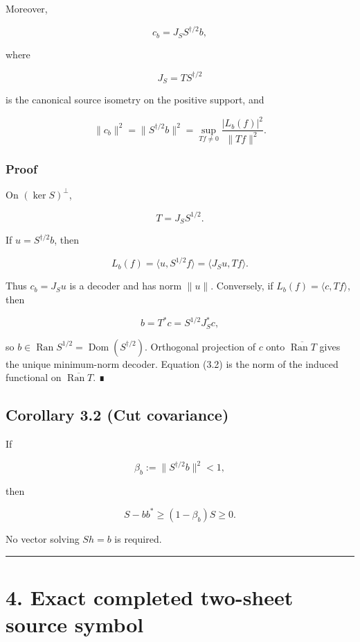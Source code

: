 Moreover,

\[
\boxed{
c_b=J_S S^{\dagger/2}b,
}
\tag{3.1}
\]

where

\[
J_S=T S^{\dagger/2}
\]

is the canonical source isometry on the positive support, and

\[
\boxed{
\|c_b\|^2
=
\|S^{\dagger/2}b\|^2
=
\sup_{Tf\ne0}
\frac{|L_b(f)|^2}{\|Tf\|^2}.
}
\tag{3.2}
\]

\hypertarget{proof}{%
\subsubsection{Proof}\label{proof}}

On \((\ker S)^\perp\),

\[
T=J_S S^{1/2}.
\]

If \(u=S^{\dagger/2}b\), then

\[
L_b(f)
=
\langle u,S^{1/2}f\rangle
=
\langle J_Su,Tf\rangle.
\]

Thus \(c_b=J_Su\) is a decoder and has norm \(\|u\|\). Conversely, if
\(L_b(f)=\langle c,Tf\rangle\), then

\[
b=T^*c=S^{1/2}J_S^*c,
\]

so \(b\in\operatorname{Ran}S^{1/2} =\operatorname{Dom}(S^{\dagger/2})\). Orthogonal projection of \(c\) onto
\(\overline{\operatorname{Ran}T}\) gives the unique minimum-norm decoder.
Equation (3.2) is the norm of the induced functional on
\(\overline{\operatorname{Ran}T}\). ∎

\hypertarget{corollary-3.2-cut-covariance}{%
\subsection{Corollary 3.2 (Cut covariance)}\label{corollary-3.2-cut-covariance}}

If

\[
\beta_b:=\|S^{\dagger/2}b\|^2<1,
\]

then

\[
\boxed{
S-bb^*
\ge
(1-\beta_b)S
\ge0.
}
\tag{3.3}
\]

No vector solving \(Sh=b\) is required.

\begin{center}\rule{0.5\linewidth}{0.5pt}\end{center}

\hypertarget{exact-completed-two-sheet-source-symbol}{%
\section{4. Exact completed two-sheet source symbol}\label{exact-completed-two-sheet-source-symbol}}

